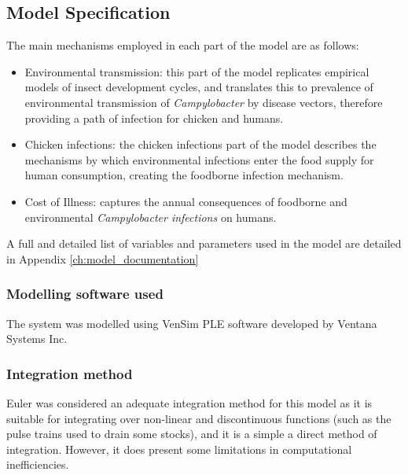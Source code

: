 \subsection{Model Specification}
The main mechanisms employed in each part of the model are as follows:
\begin{itemize}
    \item Environmental transmission: this part of the model replicates empirical models of insect development cycles, and translates this to prevalence of environmental transmission of \textit{Campylobacter} by disease vectors, therefore providing a path of infection for chicken and humans.
    \item Chicken infections: the chicken infections part of the model describes the mechanisms by which environmental infections enter the food supply for human consumption, creating the foodborne infection mechanism.
    \item Cost of Illness: captures the annual consequences of foodborne and environmental \textit{Campylobacter infections} on humans. %
    
\end{itemize} %

A full and detailed list of variables and parameters used in the model are detailed in Appendix \ref{ch:model_documentation}

\subsubsection{Modelling software used}
The system was modelled using VenSim PLE software developed by Ventana Systems Inc.
    
\subsubsection{Integration method}
Euler was considered an adequate integration method for this model as it is suitable for integrating over non-linear and discontinuous functions (such as the pulse trains used to drain some stocks), and it is a simple a direct method of integration. However, it does present some limitations in computational inefficiencies.


